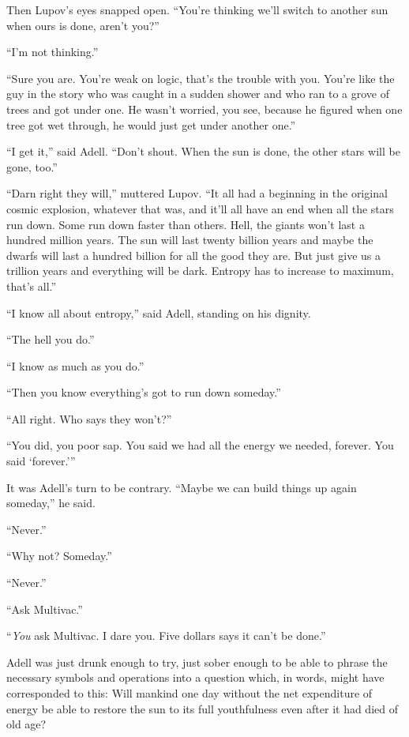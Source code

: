 Then Lupov's eyes snapped open. \enquote{You're thinking we'll switch to another sun when ours is done, aren't you?}

\enquote{I'm not thinking.}

\enquote{Sure you are. You're weak on logic, that's the trouble with you. You're like the guy in the story who was caught in a sudden shower and who ran to a grove of trees and got under one. He wasn't worried, you see, because he figured when one tree got wet through, he would just get under another one.}

\enquote{I get it,} said Adell. \enquote{Don't shout. When the sun is done, the other stars will be gone, too.}

\enquote{Darn right they will,} muttered Lupov. \enquote{It all had a beginning in the original cosmic explosion, whatever that was, and it'll all have an end when all the stars run down. Some run down faster than others. Hell, the giants won't last a hundred million years. The sun will last twenty billion years and maybe the dwarfs will last a hundred billion for all the good they are. But just give us a trillion years and everything will be dark. Entropy has to increase to maximum, that's all.}

\enquote{I know all about entropy,} said Adell, standing on his dignity.

\enquote{The hell you do.}

\enquote{I know as much as you do.}

\enquote{Then you know everything's got to run down someday.}

\enquote{All right. Who says they won't?}

\enquote{You did, you poor sap. You said we had all the energy we needed, forever. You said \enquote{forever.}}

It was Adell's turn to be contrary. \enquote{Maybe we can build things up again someday,} he said.

\enquote{Never.}

\enquote{Why not? Someday.}

\enquote{Never.}

\enquote{Ask Multivac.}

\enquote{\textit{You} ask Multivac. I dare you. Five dollars says it can't be done.}

Adell was just drunk enough to try, just sober enough to be able to phrase the necessary symbols and operations into a question which, in words, might have corresponded to this: Will mankind one day without the net expenditure of energy be able to restore the sun to its full youthfulness even after it had died of old age?

